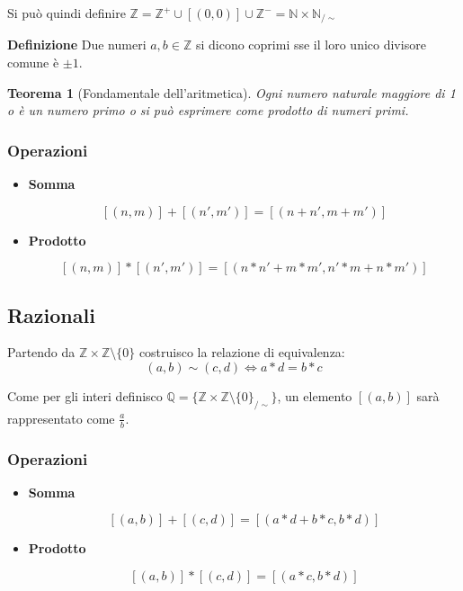 \documentclass{article}
\newtheorem{theorem}{Teorema}
\begin{document}
\noindent Si può quindi definire $\mathbb{Z}=\mathbb{Z}^+\cup[(0,0)]\cup\mathbb{Z}^-=\mathbb{N}\times\mathbb{N}_{/\sim}$\newline

\noindent\textbf{Definizione} Due numeri $a,b\in\mathbb{Z}$ si dicono coprimi sse il loro unico divisore comune è $\pm1$.\newline

\begin{theorem}[Fondamentale dell'aritmetica]
Ogni numero naturale maggiore di 1 o è un numero primo o si può esprimere come prodotto di numeri primi.
\end{theorem}

\subsubsection{Operazioni}
\begin{itemize}
    \item \textbf{Somma}

        $$[(n,m)]+[(n',m')]=[(n+n',m+m')]$$
    
    \item \textbf{Prodotto}

        $$[(n,m)]*[(n',m')]=[(n*n'+m*m',n'*m+n*m')]$$\newline
    
\end{itemize}

\subsection{Razionali}

Partendo da $\mathbb{Z}\times\mathbb{Z}\setminus\{0\}$ costruisco la relazione di equivalenza:
$$(a,b)\sim(c,d)\iff a*d=b*c$$\newline

\noindent Come per gli interi definisco $\mathbb{Q}=\{\mathbb{Z}\times\mathbb{Z}\setminus\{0\}_{/\sim}\}$, un elemento $[(a,b)]$ sarà rappresentato come $\frac{a}{b}$.

\subsubsection{Operazioni}
\begin{itemize}
    \item \textbf{Somma}

        $$[(a,b)]+[(c,d)]=[(a*d+b*c,b*d)]$$
    
    \item \textbf{Prodotto}

        $$[(a,b)]*[(c,d)]=[(a*c,b*d)]$$\newline
    
\end{itemize}
\end{document}
